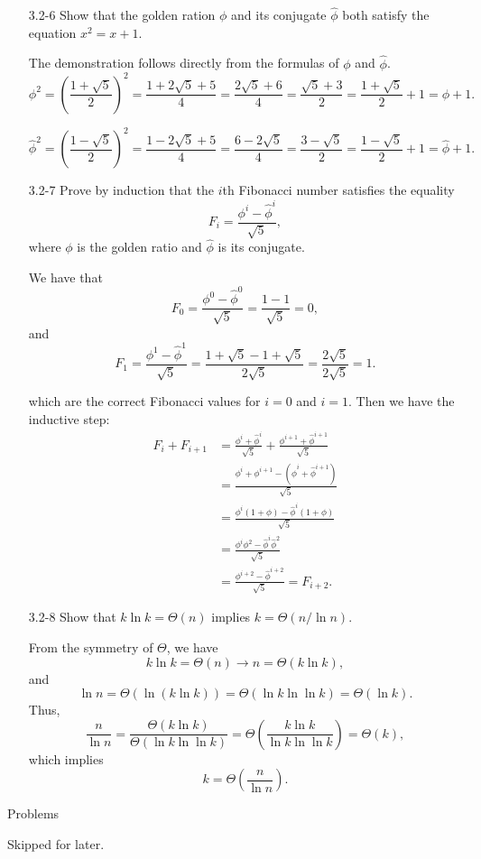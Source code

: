 \begin{enumerate}
\item[3.2{-}6]{Show that the golden ration $\phi$ and its conjugate $\hat\phi$}
both satisfy the equation $x^2 = x + 1$.

\begin{framed}
The demonstration follows directly from the formulas of $\phi$ and $\hat\phi$.
\[
\phi^2 = \left(\frac{1 + \sqrt{5}}{2}\right)^2 = \frac{1 + 2 \sqrt{5} + 5}{4}
       = \frac{2 \sqrt{5} + 6}{4} = \frac{\sqrt{5} + 3}{2}
       = \frac{1 + \sqrt{5}}{2} + 1 = \phi + 1.
\]

\[
\hat\phi^2 = \left(\frac{1 - \sqrt{5}}{2}\right)^2 = \frac{1 - 2 \sqrt{5} + 5}{4}
           = \frac{6 - 2 \sqrt{5}}{4} = \frac{3 - \sqrt{5}}{2}
           = \frac{1 - \sqrt{5}}{2} + 1 = \hat\phi + 1.
\]
\end{framed}

\item[3.2{-}7]{Prove by induction that the $i$th Fibonacci number satisfies the
equality
\[
F_i = \frac{\phi^i - \hat\phi^i}{\sqrt{5}},
\]
where $\phi$ is the golden ratio and $\hat\phi$ is its conjugate.
}

\begin{framed}
We have that
\[
F_0 = \frac{\phi^0 - \hat\phi^0}{\sqrt{5}} = \frac{1 - 1}{\sqrt{5}} = 0,
\]
and
\[
F_1 = \frac{\phi^1 - \hat\phi^1}{\sqrt{5}}
    = \frac{1 + \sqrt{5} - 1 + \sqrt{5}}{2 \sqrt{5}}
    = \frac{2 \sqrt{5}}{2 \sqrt{5}} = 1.
\]

which are the correct Fibonacci values for $i = 0$ and $i = 1$. Then we have the inductive step:
\begin{equation*}
\begin{split}
F_i + F_{i + 1} &= \frac{\phi^i + \hat\phi^i}{\sqrt{5}} +
                   \frac{\phi^{i + 1} + \hat\phi^{i + 1}}{\sqrt{5}}\\
                &= \frac{\phi^i + \phi^{i + 1} - (\hat\phi^i + \hat\phi^{i + 1})}{\sqrt{5}}\\
                &= \frac{\phi^i (1 + \phi) - \hat\phi^i (1 + \phi)}{\sqrt{5}}\\
                &= \frac{\phi^i \phi^2 - \hat\phi^i \hat\phi^2}{\sqrt{5}}\\
                &= \frac{\phi^{i + 2} - \hat\phi^{i + 2}}{\sqrt{5}} = F_{i + 2}.
\end{split}
\end{equation*}
\end{framed}

\item[3.2{-}8]{Show that $k \ln k = \Theta(n)$ implies $k = \Theta(n / \ln n)$.}

\begin{framed}
From the symmetry of $\Theta$, we have
\[
k \ln k = \Theta(n) \rightarrow n = \Theta(k \ln k),
\]
and
\[
\ln n = \Theta(\ln(k \ln k)) = \Theta(\ln k \ln \ln k) = \Theta(\ln k).
\]
Thus,
\[
\frac{n}{\ln n} = \frac{\Theta(k \ln k)}{\Theta(\ln k \ln \ln k)}
                = \Theta\left(\frac{k \ln k}{\ln k \ln \ln k}\right)
                = \Theta(k),
\]
which implies
\[
k = \Theta\left(\frac{n}{\ln n}\right).
\]
\end{framed}

\end{enumerate}

\newpage

{\large Problems}

\vspace{0.8em}
Skipped for later.
